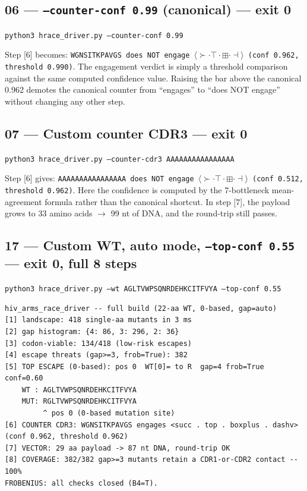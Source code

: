 \documentclass{article}
\begin{document}
\subsection*{06 --- \texttt{--counter-conf 0.99} (canonical) --- exit 0}
\texttt{python3 hrace\_driver.py --counter-conf 0.99}

Step [6] becomes:
\texttt{WGNSITKPAVGS does NOT engage \(\langle \succ \cdot \top \cdot \boxplus \cdot \dashv \rangle\) (conf 0.962, threshold 0.990)}.
The engagement verdict is simply a threshold comparison against the same
computed confidence value. Raising the bar above the canonical 0.962 demotes the
canonical counter from ``engages'' to ``does NOT engage'' without changing any
other step.

\subsection*{07 --- Custom counter CDR3 --- exit 0}
\texttt{python3 hrace\_driver.py --counter-cdr3 AAAAAAAAAAAAAAAA}

Step [6] gives:
\texttt{AAAAAAAAAAAAAAAA does NOT engage \(\langle \succ \cdot \top \cdot \boxplus \cdot \dashv \rangle\) (conf 0.512, threshold 0.962)}.
Here the confidence is computed by the 7-bottleneck mean-agreement formula rather
than the canonical shortcut. In step [7], the payload grows to 33 amino acids
\(\to\) 99 nt of DNA, and the round-trip still passes.

\subsection*{17 --- Custom WT, auto mode, \texttt{--top-conf 0.55} --- exit 0, full 8 steps}
\texttt{python3 hrace\_driver.py --wt AGLTVWPSQNRDEHKCITFVYA --top-conf 0.55}

\begin{lstlisting}
hiv_arms_race_driver -- full build (22-aa WT, 0-based, gap=auto)
[1] landscape: 418 single-aa mutants in 3 ms
[2] gap histogram: {4: 86, 3: 296, 2: 36}
[3] codon-viable: 134/418 (low-risk escapes)
[4] escape threats (gap>=3, frob=True): 382
[5] TOP ESCAPE (0-based): pos 0  WT[0]= to R  gap=4 frob=True conf=0.60
    WT : AGLTVWPSQNRDEHKCITFVYA
    MUT: RGLTVWPSQNRDEHKCITFVYA
         ^ pos 0 (0-based mutation site)
[6] COUNTER CDR3: WGNSITKPAVGS engages <succ . top . boxplus . dashv> (conf 0.962, threshold 0.962)
[7] VECTOR: 29 aa payload -> 87 nt DNA, round-trip OK
[8] COVERAGE: 382/382 gap>=3 mutants retain a CDR1-or-CDR2 contact -- 100%
FROBENIUS: all checks closed (B4=T).
\end{lstlisting}
\end{document}
